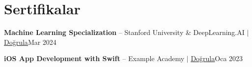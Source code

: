 \section{Sertifikalar}
\resumeSubHeadingListStart

    \resumeProjectHeading
    {\textbf{Machine Learning Specialization} -- Stanford University \& DeepLearning.AI $|$ \href{https://example.com/verify/ml}{\underline{Doğrula}}}{Mar 2024}

    \resumeProjectHeading
    {\textbf{iOS App Development with Swift} -- Example Academy $|$ \href{https://example.com/verify/ios}{\underline{Doğrula}}}{Oca 2023}

\resumeSubHeadingListEnd
\vspace{2pt}
